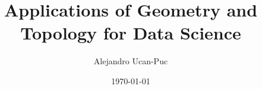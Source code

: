 \documentclass[
	fontsize=10pt, %
	twoside=false, %
	secnumdepth=1, %
]{kaobook}
\begin{document}

\titlehead{A manual for MA2007B}
\title[Applications of Geometry and Topology for Data Science]{Applications of Geometry and Topology for Data Science}
\author[AUP]{Alejandro Ucan-Puc}
\date{\today}
\publishers{Instituto Tecnólogico y de Estudios Superiores de Monterrey}

\maketitle

\frontmatter %




\begingroup %

\setlength{\textheight}{230\vscale} %

\etocstandarddisplaystyle %
\etocstandardlines %

\tableofcontents %

\listoffigures %

\let\cleardoublepage\bigskip
\let\clearpage\bigskip
\end{document}
